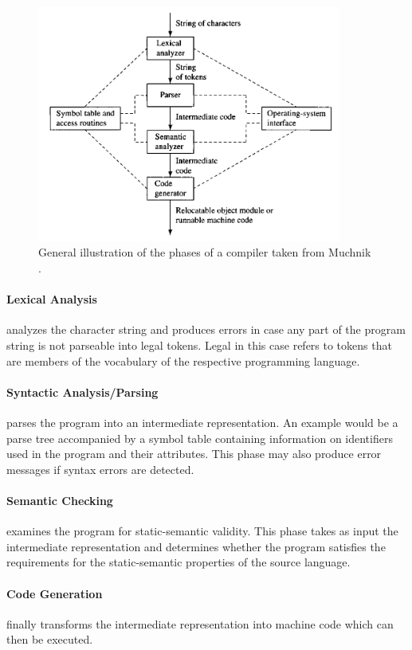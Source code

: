 \documentclass[runningheads]{llncs}
\begin{document}
\begin{figure}

\centering
\includegraphics[width=10cm]{compiler.png}
\caption{General illustration of the phases of a compiler taken from Muchnik \cite{muchnick1997advanced}.}
\label{fig:compiler}
\end{figure}

\paragraph{Lexical Analysis} analyzes the character string and produces errors in case any part of the program string is not parseable into legal tokens. Legal in this case refers to tokens that are members of the vocabulary of the respective programming language.

\paragraph{Syntactic Analysis/Parsing} parses the program into an intermediate representation. An example would be a parse tree accompanied by a symbol table containing information on identifiers used in the program and their attributes. This phase may also produce error messages if syntax errors are detected.

\paragraph{Semantic Checking} examines the program for static-semantic validity. This phase takes as input the intermediate representation and determines whether the program satisfies the requirements for the static-semantic properties of the source language.

\paragraph{Code Generation} finally transforms the intermediate representation into machine code which can then be executed. 
\end{document}
